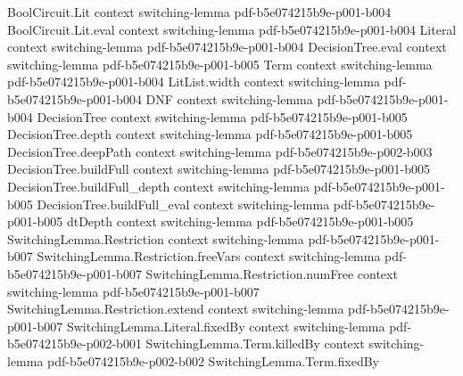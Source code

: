 \begin{lemma}
\label{SwitchingLemma.aux_image_card_bound}
\leanok
{}
\proofstep
  {BoolCircuit.Lit}
  {context}
  {switching-lemma}
  {pdf-b5e074215b9e-p001-b004}
\proofstep
  {BoolCircuit.Lit.eval}
  {context}
  {switching-lemma}
  {pdf-b5e074215b9e-p001-b004}
\proofstep
  {Literal}
  {context}
  {switching-lemma}
  {pdf-b5e074215b9e-p001-b004}
\proofstep
  {DecisionTree.eval}
  {context}
  {switching-lemma}
  {pdf-b5e074215b9e-p001-b005}
\proofstep
  {Term}
  {context}
  {switching-lemma}
  {pdf-b5e074215b9e-p001-b004}
\proofstep
  {LitList.width}
  {context}
  {switching-lemma}
  {pdf-b5e074215b9e-p001-b004}
\proofstep
  {DNF}
  {context}
  {switching-lemma}
  {pdf-b5e074215b9e-p001-b004}
\proofstep
  {DecisionTree}
  {context}
  {switching-lemma}
  {pdf-b5e074215b9e-p001-b005}
\proofstep
  {DecisionTree.depth}
  {context}
  {switching-lemma}
  {pdf-b5e074215b9e-p001-b005}
\proofstep
  {DecisionTree.deepPath}
  {context}
  {switching-lemma}
  {pdf-b5e074215b9e-p002-b003}
\proofstep
  {DecisionTree.buildFull}
  {context}
  {switching-lemma}
  {pdf-b5e074215b9e-p001-b005}
\proofstep
  {DecisionTree.buildFull_depth}
  {context}
  {switching-lemma}
  {pdf-b5e074215b9e-p001-b005}
\proofstep
  {DecisionTree.buildFull_eval}
  {context}
  {switching-lemma}
  {pdf-b5e074215b9e-p001-b005}
\proofstep
  {dtDepth}
  {context}
  {switching-lemma}
  {pdf-b5e074215b9e-p001-b005}
\proofstep
  {SwitchingLemma.Restriction}
  {context}
  {switching-lemma}
  {pdf-b5e074215b9e-p001-b007}
\proofstep
  {SwitchingLemma.Restriction.freeVars}
  {context}
  {switching-lemma}
  {pdf-b5e074215b9e-p001-b007}
\proofstep
  {SwitchingLemma.Restriction.numFree}
  {context}
  {switching-lemma}
  {pdf-b5e074215b9e-p001-b007}
\proofstep
  {SwitchingLemma.Restriction.extend}
  {context}
  {switching-lemma}
  {pdf-b5e074215b9e-p001-b007}
\proofstep
  {SwitchingLemma.Literal.fixedBy}
  {context}
  {switching-lemma}
  {pdf-b5e074215b9e-p002-b001}
\proofstep
  {SwitchingLemma.Term.killedBy}
  {context}
  {switching-lemma}
  {pdf-b5e074215b9e-p002-b002}
\proofstep
  {SwitchingLemma.Term.fixedBy}

\end{lemma}
